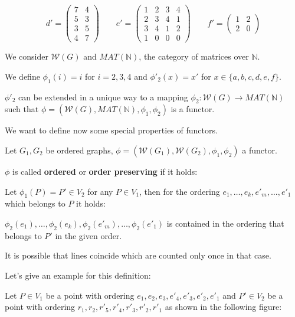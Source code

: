 \[
d' = \left( \begin{array}{cc}
7 & 4 \\ 5 & 3 \\ 3 & 5 \\ 4 & 7
\end{array} \right)
\qquad
e' = \left( \begin{array}{cccc}
1&2&3&4 \\ 2&3&4&1 \\ 3&4&1&2 \\ 1&0&0&0
\end{array} \right)
\qquad
f' = \left( \begin{array}{cc}
1&2 \\ 2&0
\end{array} \right)
\]

We consider $\mathcal{W}(G)$ and $MAT(\mathbb{N})$, the category of matrices
over $\mathbb{N}$.

We define $\phi_1(i) = i$ for $i = 2,3,4$ and $\phi'_2(x) = x'$ for $x \in \{
a, b, c, d, e, f \}$.

$\phi'_2$ can be extended in a unique way to a mapping $\phi_2 :
\mathcal{W}(G) \to MAT(\mathbb{N})$ such that $\phi = (\mathcal{W}(G),
MAT(\mathbb{N}), \phi_1, \phi_2)$ is a functor.

We want to define now some special properties of functors.

\begin{definition}
Let $G_1, G_2$ be ordered graphs, $\phi = (\mathcal{W}(G_1), \mathcal{W}(G_2),
\phi_1, \phi_2)$ a functor.

$\phi$ is called {\bf ordered} or {\bf order preserving} if it holds:

Let $\phi_1(P) = P' \in V_2$ for any $P \in V_1$, then for the ordering $e_1,
\ldots, e_k, e'_m, \ldots, e'_1$ which belongs to $P$ it holds:

$\phi_2(e_1), \ldots, \phi_2(e_k), \phi_2(e'_m), \ldots, \phi_2(e'_1)$ is
contained in the ordering that belongs to $P'$ in the given order. 
\end{definition}

It is possible that lines coincide which are counted only once in that case.

Let's give an example for this definition:

Let $P \in V_1$ be a point with ordering $e_1, e_2, e_3, e'_4, e'_3, e'_2,
e'_1$ and $P' \in V_2$ be a point with ordering $r_1, r_2, r'_5,
r'_4, r'_3, r'_2, r'_1$ as shown in the following figure:

